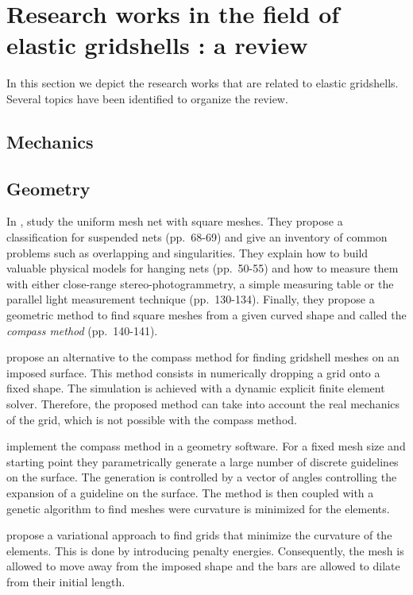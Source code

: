 \clearpage
\section{Research works in the field of elastic gridshells : a review}
In this section we depict the research works that are related to elastic gridshells. Several topics have been identified to organize the review.

\subsection{Mechanics}
\subsection{Geometry}
In ,  study the uniform mesh net with square meshes. They propose a classification for suspended nets (pp.~68-69) and give an inventory of common problems such as overlapping and singularities. They explain how to build valuable physical models for hanging nets (pp.~50-55) and how to measure them with either close-range stereo-photogrammetry, a simple measuring table or the parallel light measurement technique (pp.~130-134). Finally, they propose a geometric method to find square meshes from a given curved shape and called the \emph{compass method} (pp.~140-141).

 propose an alternative to the compass method for finding gridshell meshes on an imposed surface. This method consists in numerically dropping a grid onto a fixed shape. The simulation is achieved with a dynamic explicit finite element solver. Therefore, the proposed method can take into account the real mechanics of the grid, which is not possible with the compass method.

 implement the compass method in a geometry software. For a fixed mesh size and starting point they parametrically generate a large number of discrete guidelines on the surface. The generation is controlled by a vector of angles controlling the expansion of a guideline on the surface. The method is then coupled with a genetic algorithm to find meshes were curvature is minimized for the elements.

 propose a variational approach to find grids that minimize the curvature of the elements. This is done by introducing penalty energies. Consequently, the mesh is allowed to move away from the imposed shape and the bars are allowed to dilate from their initial length.

